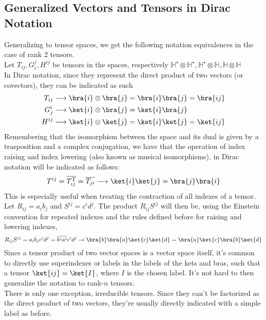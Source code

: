 \documentclass[../qm.tex]{subfiles}
\begin{document}
	\subsection{Generalized Vectors and Tensors in Dirac Notation}
	Generalizing to tensor spaces, we get the following notation equivalences in the case of rank 2 tensors.\\
	Let $T_{ij},G_{i}^{j},H^{ij}$ be tensors in the spaces, respectively $\mathbb{H}^{\star}\otimes\mathbb{H}^{\star},\mathbb{H}^{\star}\otimes\mathbb{H},\mathbb{H}\otimes\mathbb{H}$\\
	In Dirac notation, since they represent the direct product of two vectors (or covectors), they can be indicated as such
	\begin{equation}
		\begin{aligned}
			T_{ij}&\longrightarrow\bra{i}\otimes\bra{j}=\bra{i}\bra{j}=\bra{ij}\\
			G^i_j&\longrightarrow\ket{i}\otimes\bra{j}=\ket{i}\bra{j}\\
			H^{ij}&\longrightarrow\ket{i}\otimes\ket{j}=\ket{i}\ket{j}=\ket{ij}
		\end{aligned}
		\label{eq:tensorsdiracnot}
	\end{equation}
	Remembering that the isomorphism between the space and its dual is given by a trasposition and a complex conjugation, we have that the operation of index raising and index lowering (also known as musical isomorphisms), in Dirac notation will be indicated as follows:
	\begin{equation}
		T^{ij}=\overline{T_{ij}^{\text{T}}}=\overline{T_{ji}}\longrightarrow\ket{i}\ket{j}=\bra{j}\bra{i}
		\label{eq:musicalisomorphism}
	\end{equation}
	This is especially useful when treating the contraction of all indexes of a tensor.\\
	Let $R_{ij}=a_ib_j$ and $S^{ij}=c^id^j$. The product $R_{ij}S^{ij}$ will then be, using the Einstein convention for repeated indexes and the rules defined before for raising and lowering indexes,
	\begin{equation}
		R_{ij}S^{ij}=a_ib_jc^id^j=\overline{b^ja^i}c^id^j\to\bra{b}\bra{a}\ket{c}\ket{d}=\bra{a}\ket{c}\bra{b}\ket{d}
		\label{eq:doublescalarprod}
	\end{equation}
	Since a tensor product of two vector spaces is a vector space itself, it's common to directly use superindexes or labels in the labels of the kets and bras, such that a tensor $\ket{ij}=\ket{I}$, where $I$ is the chosen label. It's not hard to then generalize the notation to rank-$n$ tensors.\\
	There is only one exception, irreducible tensors. Since they can't be factorized as the direct product of two vectors, they're usually directly indicated with a simple label as before.\\
\end{document}
